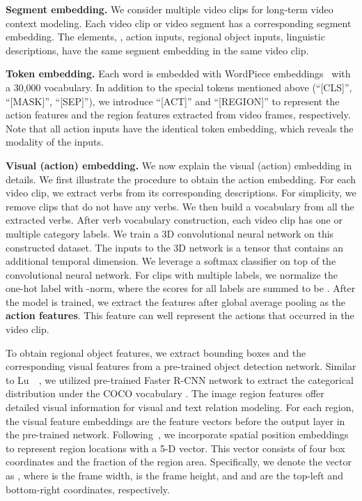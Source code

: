 \documentclass[10pt,twocolumn,letterpaper]{article}
\begin{document}
\noindent\textbf{Segment embedding.}
We consider multiple video clips for long-term video context modeling.
Each video clip or video segment has a corresponding segment embedding.
The elements, \ie, action inputs, regional object inputs, linguistic descriptions, have the same segment embedding in the same video clip.

\noindent\textbf{Token embedding.}
Each word is embedded with WordPiece embeddings~\cite{wu2016google} with a 30,000 vocabulary.
In addition to the special tokens mentioned above (``[CLS]'', ``[MASK]'', ``[SEP]''), we introduce ``[ACT]'' and ``[REGION]'' to represent the action features and the region features extracted from video frames, respectively. Note that all action inputs have the identical token embedding, which reveals the modality of the inputs.

\noindent\textbf{Visual (action) embedding.}
We now explain the visual (action) embedding in details. We first illustrate the procedure to obtain the action embedding. 
For each video clip, we extract verbs from its corresponding descriptions.
For simplicity, we remove clips that do not have any verbs. We then build a vocabulary from all the extracted verbs. After verb vocabulary construction, each video clip has one or multiple category labels. We train a 3D convolutional neural network on this constructed dataset. The inputs to the 3D network is a tensor that contains an additional temporal dimension. We leverage a softmax classifier on top of the convolutional neural network. For clips with multiple labels, we normalize the one-hot label with -norm, where the scores for all labels are summed to be . After the model is trained, we extract the features after global average pooling as the \textbf{action features}. This feature can well represent the actions that occurred in the video clip.

To obtain regional object features, we extract bounding boxes and the corresponding
visual features from a pre-trained object detection network.
Similar to Lu~\etal~\cite{lu2019vilbert}, we utilized pre-trained Faster R-CNN network \cite{ren2015faster} to extract the categorical distribution under the COCO vocabulary \cite{lin2014microsoft}. The image region features offer detailed visual information for visual and text relation modeling. 
For each region, the visual feature embeddings are the feature vectors before the output layer in the pre-trained network.
Following~\cite{lu2019vilbert}, we incorporate spatial position embeddings to represent region locations with a 5-D vector. This vector consists of four box coordinates and the fraction of the region area. Specifically, we denote the vector as , where  is the frame width,  is the frame height, and  and  are the top-left and bottom-right coordinates, respectively.
\end{document}
